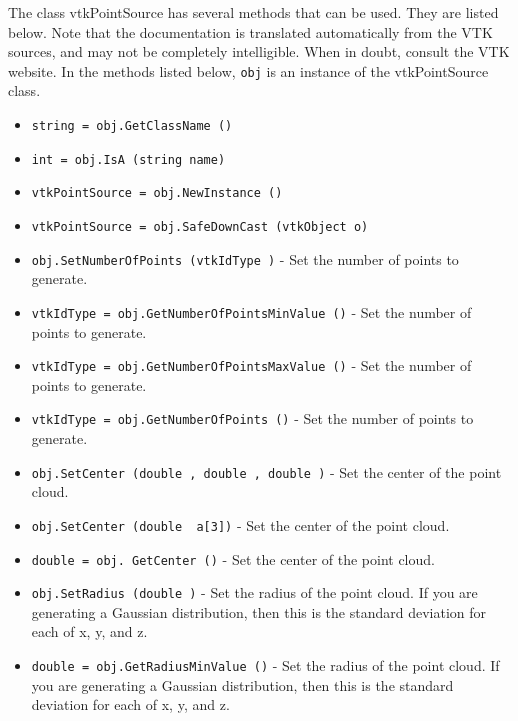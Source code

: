 The class vtkPointSource has several methods that can be used.
  They are listed below.
Note that the documentation is translated automatically from the VTK sources,
and may not be completely intelligible.  When in doubt, consult the VTK website.
In the methods listed below, \verb|obj| is an instance of the vtkPointSource class.
\begin{itemize}
\item  \verb|string = obj.GetClassName ()|

\item  \verb|int = obj.IsA (string name)|

\item  \verb|vtkPointSource = obj.NewInstance ()|

\item  \verb|vtkPointSource = obj.SafeDownCast (vtkObject o)|

\item  \verb|obj.SetNumberOfPoints (vtkIdType )| -  Set the number of points to generate.

\item  \verb|vtkIdType = obj.GetNumberOfPointsMinValue ()| -  Set the number of points to generate.

\item  \verb|vtkIdType = obj.GetNumberOfPointsMaxValue ()| -  Set the number of points to generate.

\item  \verb|vtkIdType = obj.GetNumberOfPoints ()| -  Set the number of points to generate.

\item  \verb|obj.SetCenter (double , double , double )| -  Set the center of the point cloud.

\item  \verb|obj.SetCenter (double  a[3])| -  Set the center of the point cloud.

\item  \verb|double = obj. GetCenter ()| -  Set the center of the point cloud.

\item  \verb|obj.SetRadius (double )| -  Set the radius of the point cloud.  If you are
 generating a Gaussian distribution, then this is
 the standard deviation for each of x, y, and z.

\item  \verb|double = obj.GetRadiusMinValue ()| -  Set the radius of the point cloud.  If you are
 generating a Gaussian distribution, then this is
 the standard deviation for each of x, y, and z.


\end{itemize}
